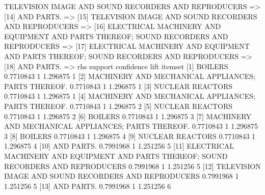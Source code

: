 \documentclass [a4paper] {article}
\begin{document}
{\begin{Schunk}
\begin{Soutput}
[13] {TELEVISION IMAGE AND SOUND RECORDERS AND REPRODUCERS}                                                                                       =>
[14] {AND PARTS.}                                                                                                                                 =>
[15] {TELEVISION IMAGE AND SOUND RECORDERS AND REPRODUCERS}                                                                                       =>
[16] {ELECTRICAL MACHINERY AND EQUIPMENT AND PARTS THEREOF; SOUND RECORDERS AND REPRODUCERS}                                                      =>
[17] {ELECTRICAL MACHINERY AND EQUIPMENT AND PARTS THEREOF; SOUND RECORDERS AND REPRODUCERS}                                                      =>
[18] {AND PARTS.}                                                                                                                                 =>
     rhs                                                                                     support   confidence lift     itemset
[1]  {BOILERS}                                                                               0.7710843 1          1.296875 1      
[2]  {MACHINERY AND MECHANICAL APPLIANCES; PARTS THEREOF.}                                   0.7710843 1          1.296875 1      
[3]  {NUCLEAR REACTORS}                                                                      0.7710843 1          1.296875 1      
[4]  {MACHINERY AND MECHANICAL APPLIANCES; PARTS THEREOF.}                                   0.7710843 1          1.296875 2      
[5]  {NUCLEAR REACTORS}                                                                      0.7710843 1          1.296875 2      
[6]  {BOILERS}                                                                               0.7710843 1          1.296875 3      
[7]  {MACHINERY AND MECHANICAL APPLIANCES; PARTS THEREOF.}                                   0.7710843 1          1.296875 3      
[8]  {BOILERS}                                                                               0.7710843 1          1.296875 4      
[9]  {NUCLEAR REACTORS}                                                                      0.7710843 1          1.296875 4      
[10] {AND PARTS.}                                                                            0.7991968 1          1.251256 5      
[11] {ELECTRICAL MACHINERY AND EQUIPMENT AND PARTS THEREOF; SOUND RECORDERS AND REPRODUCERS} 0.7991968 1          1.251256 5      
[12] {TELEVISION IMAGE AND SOUND RECORDERS AND REPRODUCERS}                                  0.7991968 1          1.251256 5      
[13] {AND PARTS.}                                                                            0.7991968 1          1.251256 6      

\end{Soutput}
\end{Schunk}}
\end{document}

